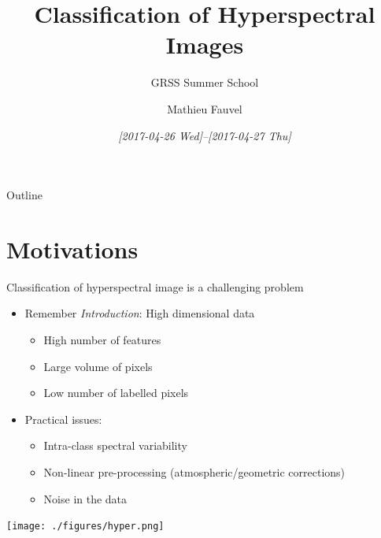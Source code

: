 \documentclass[10pt,aspectratio=1610,,color={dvipsnames,usenames,table},table]{beamer}
\author{Mathieu Fauvel}
\date{\textit{[2017-04-26 Wed]--[2017-04-27 Thu]}}
\title{Classification of Hyperspectral Images}
\subtitle{GRSS Summer School}
\institute{UMR Dynafor}
\begin{document}
\maketitle
\begin{frame}{Outline}
\tableofcontents
\end{frame}

\section{Motivations}
\label{sec:org9afa398}
\begin{frame}[label={sec:org914531b}]{Classification of hyperspectral image is a challenging problem}
\begin{itemize}
\item Remember \emph{Introduction}: \alert{High dimensional data}
\begin{itemize}
\item High number of features
\item Large volume of pixels
\item Low number of labelled pixels
\end{itemize}
\item Practical issues:
\begin{itemize}
\item Intra-class spectral variability
\item Non-linear pre-processing (atmospheric/geometric corrections)
\item Noise in the data
\end{itemize}
\end{itemize}

\begin{center}
\begin{center}
\texttt{[image: ./figures/hyper.png]}
\end{center}
\end{center}
\end{frame}
\end{document}
